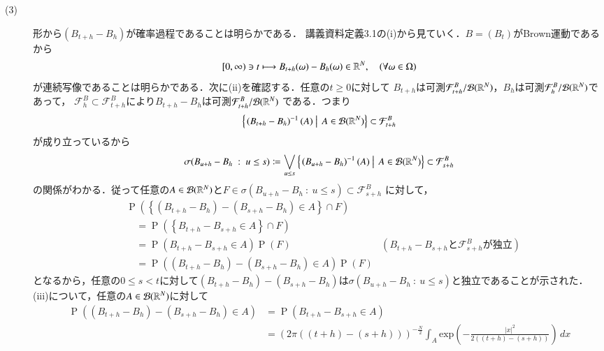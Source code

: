 \begin{prf}
\begin{description}
	\item[(3)] 形から$(B_{t+h} - B_h)$が確率過程であることは明らかである．
		講義資料定義3.1の(i)から見ていく．$B = (B_t)$がBrown運動であるから
		\begin{align}
			[0,\infty) \ni t \longmapsto B_{t+h}(\omega) - B_h(\omega) \in \mathbb{R}^N, \quad(\forall \omega \in \Omega)
		\end{align}
		が連続写像であることは明らかである．次に(ii)を確認する．任意の$t \geq 0$に対して
		$B_{t+h}$は可測$\mathcal{F}_{t+h}^B/\mathcal{B}(\mathbb{R}^N)$，$B_h$は可測$\mathcal{F}_h^B/\mathcal{B}(\mathbb{R}^N)$であって，
		$\mathcal{F}_{h}^B \subset \mathcal{F}_{t+h}^B$により$B_{t+h} - B_h$は可測$\mathcal{F}_{t+h}^B/\mathcal{B}(\mathbb{R}^N)$
		である．つまり
		\begin{align}
			\left\{ \left. \left(B_{t+h} - B_h\right)^{-1}(A)\ \right|\ A \in \borel{\R^N} \right\}
			\subset \mathcal{F}_{t+h}^B %
		\end{align}
		が成り立っているから
		\begin{align}
			\sigma(B_{u+h} - B_h\ :\ u \leq s)
			\coloneqq \bigvee_{u \leq s} \left\{ \left. \left(B_{u+h} - B_h\right)^{-1}(A)\ \right|\ A \in \mathcal{B}(\mathbb{R}^N) \right\}
			\subset \mathcal{F}_{s+h}^B 
		\end{align}
		の関係がわかる．従って任意の$A \in \mathcal{B}(\mathbb{R}^N)$と$F \in \sigma(B_{u+h} - B_h\ :\ u \leq s) \subset \mathcal{F}_{s+h}^B $
		に対して，
		\begin{align}
			&\operatorname{P}\left( \left\{ (B_{t+h} - B_h) - (B_{s+h} - B_h) \in A \right\} \cap F \right) \\
			&\quad= \operatorname{P}\left( \left\{ B_{t+h} - B_{s+h} \in A \right\} \cap F \right) \\
			&\quad= \operatorname{P}\left( B_{t+h} - B_{s+h} \in A \right) \operatorname{P}(F) & (\mbox{$B_{t+h} - B_{s+h}$と$\mathcal{F}_{s+h}^B$が独立}) \\
			&\quad= \operatorname{P}\left( (B_{t+h} - B_h) - (B_{s+h} - B_h) \in A \right) \operatorname{P}(F)
		\end{align}
		となるから，任意の$0 \leq s < t$に対して$(B_{t+h} - B_h) - (B_{s+h} - B_h)$は$\sigma(B_{u+h} - B_h\ :\ u \leq s)$と独立であることが示された．
		(iii)について，任意の$A \in \mathcal{B}(\mathbb{R}^N)$に対して
		\begin{align}
			\operatorname{P}\left( (B_{t+h} - B_h) - (B_{s+h} - B_h) \in A \right)
			&= \operatorname{P}\left( B_{t+h} - B_{s+h} \in A \right) \\
			&= (2\pi((t+h)-(s+h)))^{-\frac{N}{2}} \int_{A} \mathrm{exp}\left( -\frac{|x|^2}{2((t+h)-(s+h))} \right)\, dx \\

\end{align}
\end{description}
\end{prf}
